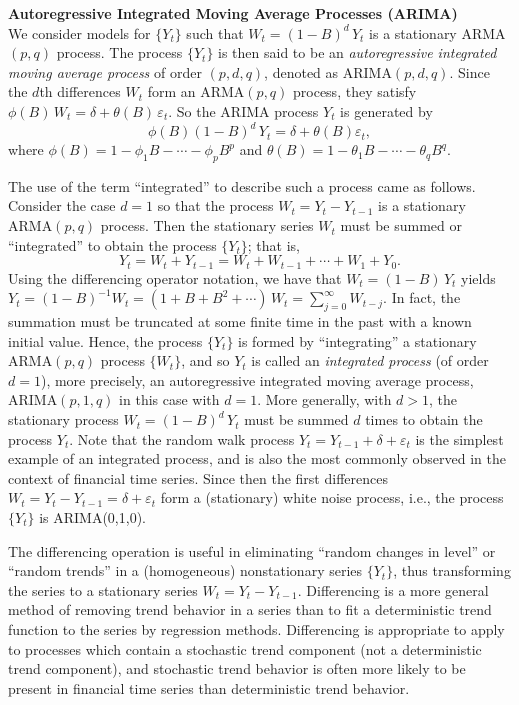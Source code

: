 \noindent\textbf{Autoregressive Integrated Moving Average Processes (ARIMA)} \\


We consider models for $\{ Y_t \}$ such that $W_t = (1 - B)^d\, Y_t$ is a stationary ARMA$(p,q)$ process. The process $\{ Y_t \}$ is then said to be an \emph{autoregressive integrated moving average process} of order $(p,d,q)$, denoted as ARIMA$(p,d,q)$. Since the $d$th differences $W_t$ form an ARMA$(p,q)$ process, they satisfy $\phi(B)\, W_t = \delta + \theta(B)\, \varepsilon_t$. So the ARIMA process $Y_t$ is generated by 
	\begin{equation} \label{eqn:phiBdy}
	\phi(B)(1 - B)^d\, Y_t = \delta + \theta(B)\varepsilon_t,
	\end{equation}
where $\phi(B) = 1 - \phi_1 B - \cdots - \phi_p B^p$ and $\theta(B) = 1 - \theta_1 B - \cdots - \theta_q B^q$.


The use of the term ``integrated'' to describe such a process came as follows. Consider the case $d=1$ so that the process $W_t = Y_t - Y_{t-1}$ is a stationary ARMA$(p,q)$ process. Then the stationary series $W_t$ must be summed or ``integrated'' to obtain the process $\{Y_t\}$; that is,
	\[
	Y_t = W_t + Y_{t-1} = W_t + W_{t-1} + \cdots + W_1 + Y_0.
	\]
Using the differencing operator notation, we have that $W_t = (1 - B)\, Y_t$ yields $Y_t = (1 - B)^{-1}W_t = (1 + B + B^2 + \cdots)\, W_t = \sum_{j=0}^\infty W_{t-j}$. In fact, the summation must be truncated at some finite time in the past with a known initial value. Hence, the process $\{ Y_t \}$ is formed by ``integrating'' a stationary ARMA$(p,q)$ process $\{ W_t \}$, and so $Y_t$ is called an \emph{integrated process} (of order $d=1$), more precisely, an autoregressive integrated moving average process, ARIMA$(p,1,q)$ in this case with $d= 1$. More generally, with $d > 1$, the stationary process $W_t = (1 - B)^d\, Y_t$ must be summed $d$ times to obtain the process $Y_t$. Note that the random walk process $Y_t = Y_{t-1} + \delta + \varepsilon_t$ is the simplest example of an integrated process, and is also the most commonly observed in the context of financial time series. Since then the first differences $W_t = Y_t - Y_{t-1} = \delta + \varepsilon_t$ form a (stationary) white noise process, i.e., the process $\{ Y_t \}$ is ARIMA(0,1,0).


The differencing operation is useful in eliminating ``random changes in level'' or ``random trends'' in a (homogeneous) nonstationary series $\{ Y_t \}$, thus transforming the series to a stationary series $W_t = Y_t - Y_{t-1}$. Differencing is a more general method of removing trend behavior in a series than to fit a deterministic trend function to the series by regression methods. Differencing is appropriate to apply to processes which contain a stochastic trend component (not a deterministic trend component), and stochastic trend behavior is often more likely to be present in financial time series than deterministic trend behavior.


